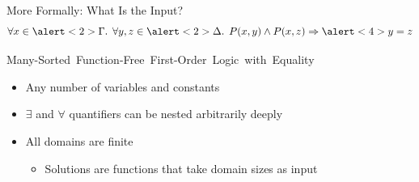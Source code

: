 \documentclass{beamer}
\begin{document}
\begin{frame}{More Formally: What Is the Input?}
  \[
    \forall x \in \alert<2>{\Gamma}\text{. }\forall y, z \in \alert<2>{\Delta}\text{. }P(x, y) \land P(x, z) \Rightarrow \alert<4>{y=z}
  \]
  \begin{block}{\mbox{\alert<2>{Many-Sorted} \alert<3>{Function-Free}
        First-Order Logic with \alert<4>{Equality}}}
  \begin{itemize}
    \item<5-> Any number of variables and constants
    \item<6-> \alert{$\exists$} and \alert{$\forall$} quantifiers can be nested
          arbitrarily deeply
    \item<6-> All domains are finite
          \begin{itemize}
            \item Solutions are functions that take domain sizes as input
          \end{itemize}
  \end{itemize}
  \end{block}
\end{frame}
\end{document}
